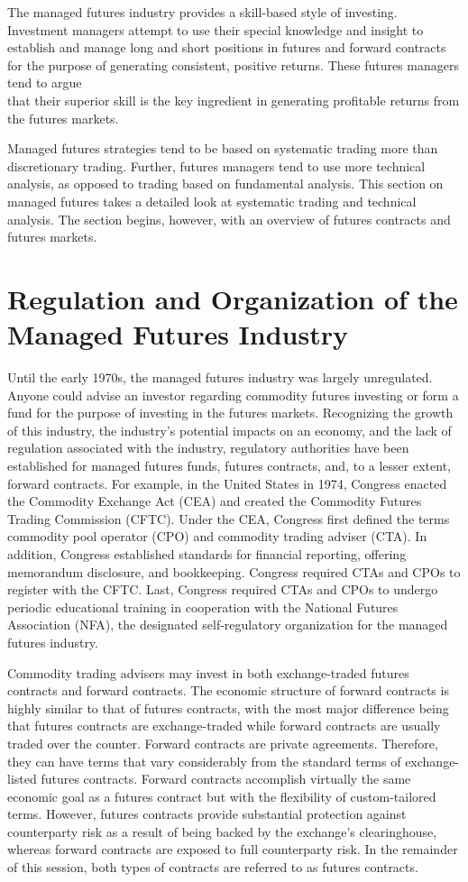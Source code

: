 \documentclass[11pt]{article}
\begin{document}
The managed futures industry provides a skill-based style of investing. Investment managers attempt to use their special knowledge and insight to establish and manage long and short positions in futures and forward contracts for the purpose of generating consistent, positive returns. These futures managers tend to argue\\
that their superior skill is the key ingredient in generating profitable returns from the futures markets.

Managed futures strategies tend to be based on systematic trading more than discretionary trading. Further, futures managers tend to use more technical analysis, as opposed to trading based on fundamental analysis. This section on managed futures takes a detailed look at systematic trading and technical analysis. The section begins, however, with an overview of futures contracts and futures markets.

\section*{Regulation and Organization of the Managed Futures Industry}
Until the early 1970s, the managed futures industry was largely unregulated. Anyone could advise an investor regarding commodity futures investing or form a fund for the purpose of investing in the futures markets. Recognizing the growth of this industry, the industry's potential impacts on an economy, and the lack of regulation associated with the industry, regulatory authorities have been established for managed futures funds, futures contracts, and, to a lesser extent, forward contracts. For example, in the United States in 1974, Congress enacted the Commodity Exchange Act (CEA) and created the Commodity Futures Trading Commission (CFTC). Under the CEA, Congress first defined the terms commodity pool operator (CPO) and commodity trading adviser (CTA). In addition, Congress established standards for financial reporting, offering memorandum disclosure, and bookkeeping. Congress required CTAs and CPOs to register with the CFTC. Last, Congress required CTAs and CPOs to undergo periodic educational training in cooperation with the National Futures Association (NFA), the designated self-regulatory organization for the managed futures industry.

Commodity trading advisers may invest in both exchange-traded futures contracts and forward contracts. The economic structure of forward contracts is highly similar to that of futures contracts, with the most major difference being that futures contracts are exchange-traded while forward contracts are usually traded over the counter. Forward contracts are private agreements. Therefore, they can have terms that vary considerably from the standard terms of exchange-listed futures contracts. Forward contracts accomplish virtually the same economic goal as a futures contract but with the flexibility of custom-tailored terms. However, futures contracts provide substantial protection against counterparty risk as a result of being backed by the exchange's clearinghouse, whereas forward contracts are exposed to full counterparty risk. In the remainder of this session, both types of contracts are referred to as futures contracts.
\end{document}
